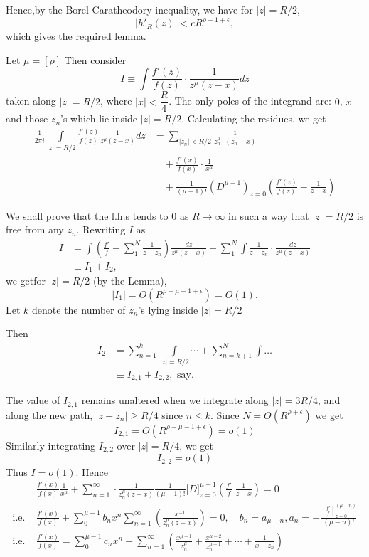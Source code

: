 Hence,\pageoriginale by the Borel-Caratheodory inequality, we have for
$|z|=R/2$, 
$$
|h'_R (z)| < c R^{\rho -1 + \epsilon},
$$
which gives the required lemma.

\medskip
{}
Let $\mu = [\rho]$ Then consider
$$
I \equiv \int \frac{f'(z)}{f(z)} \cdot \frac{1}{z^{\mu} (z-x)} dz
$$
taken along $|z| = R/2$, where $|x| < \dfrac{R}{4}$. The only poles of
the integrand are: $0$, $x$ and those $z_n$'s which lie inside $|z| =
R/2$. Calculating the residues, we get
\begin{align*}
\frac{1}{2\pi i} \int\limits_{|z| = R/2} \frac{f'(z)}{f(z)}
\frac{1}{z^{\mu} (z-x)} dz & = \sum\limits_{|z_n|< R/2} \frac{1}{z_n^\mu
\cdot (z_n -x)}\\
& \quad + \frac{f'(x)}{f(x)} \cdot \frac{1}{x^{\mu}}\\
& \quad + \frac{1}{(\mu -1)!} \left( D^{\mu-1}\right)_{z=0}
\left(\frac{f'(z)}{f(z)} - \frac{1}{z-x} \right)
\end{align*}


We shall prove that the l.h.s tends to $0$ as $R \to \infty$ in such a
way that $|z| = R /2$ is free from any $z_n$. Rewriting $I$ as 
\begin{align*}
I & = \int \left(\frac{f'}{f} - \sum^N_1 \frac{1}{z-z_n} \right)
\frac{dz}{z^\mu(z-x)} + \sum\limits^N_1 \int \frac{1}{z-z_n} \cdot
\frac{dz}{z^{\mu} (z-x)}\\
&  \equiv I_1 + I_2,
\end{align*}
we get\pageoriginale for $|z| = R/2$ (by the Lemma),
$$
|I_1| = O (R^{\rho -\mu -1 + \epsilon}) = O (1).
$$
Let $k$ denote the number of $z_n$'s lying inside $|z| = R/2$

Then 
\begin{align*}
I_2 & = \sum\limits^k_{n=1} \int\limits_{|z|=R/2} \cdots +
\sum\limits^N_{n=k+1} \int \ldots \\
& \equiv I_{2,1} + I_{2,2}, \text{ say}.
\end{align*}

The value of $I_{2,1}$ remains unaltered when we integrate along $|z|=
3 R/4$, and along the new path, $|z-z_n| \geq R/4$ since $n \leq k$. Since $N = O (R^{\rho+\epsilon})$ we get 
$$
I_{2,1} = O(R^{\rho - \mu-1+\epsilon}) =o (1)
$$
Similarly integrating $I_{2,2}$ over $|z| = R/4$, we get
$$
I_{2,2} = o(1)
$$
Thus $I = o(1)$. Hence
\begin{align*}
& \frac{f'(x)}{f(x)} \frac{1}{x^\mu} + \sum\limits^\infty_{n=1} \cdot
  \frac{1}{z^{\mu}_n (z-x)} \frac{1}{(\mu-1)!} \Big[D \Big]^{\mu
    -1}_{z=0} \left(\frac{f'}{f} \; \frac{1}{z-x} \right) =0\\
\text{i.e. } & \frac{f'(x)}{f(x)} + \sum\limits^{\mu-1}_0 b_n x^n
\sum\limits^\infty_{n=1} \left(\frac{x^{-1}}{z^{\mu}_n (z-x)} \right)
= 0, \quad b_n =a_{\mu -n}, a_n = -
\frac{\left[\frac{f'}{f} \right]^{(\mu-n)}_{z=0}}{(\mu-n)!} \\
\text{i.e. } & \frac{f'(x)}{f(x)} = \sum\limits^{\mu-1}_0 c_n x^n +
\sum\limits^{\infty}_{n=1} \left(\frac{x^{\mu-1}}{z^{\mu}_n} +
\frac{x^{\mu-2}}{z^{\mu-1}_n} + \cdots + \frac{1}{x-z_n} 
\right) 
\end{align*}\pageoriginale

